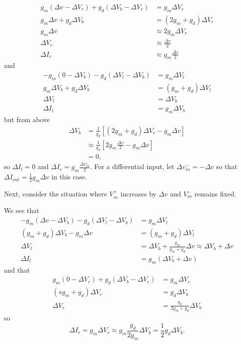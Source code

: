 \documentclass{article}
\begin{document}
\begin{align*}
g_m (\Delta v - \Delta V_r) + g_d (\Delta V_b - \Delta V_r) &= g_m \Delta V_r \\
g_m \Delta v + g_d \Delta V_b &= (2 g_m + g_d) \Delta V_r \\
g_m \Delta v &\approx 2 g_m \Delta V_r \\
\Delta V_r &\approx \frac{\Delta v}{2} \\
\Delta I_r &\approx g_m \frac{\Delta v}{2}
\end{align*}
and
\begin{align*}
-g_m (0 - \Delta V_b) - g_d (\Delta V_l - \Delta V_b) &= g_m \Delta V_l \\
g_m \Delta V_b + g_d \Delta V_b &= (g_m + g_d) \Delta V_l \\
\Delta V_l &= \Delta V_b \\
\Delta I_l &= g_m \Delta V_b
\end{align*}
but from above
\begin{align*}
\Delta V_b &= \frac{1}{g_d} [(2 g_m + g_d) \Delta V_r - g_m \Delta v] \\
           &\approx \frac{1}{g_d} [2 g_m \frac{\Delta v}{2} - g_m \Delta v] \\
           &= 0,
\end{align*}
so $\Delta I_l = 0$ and $\Delta I_r = g_m \frac{\Delta v_{in}^{-}}{2}$. For a
differential input, let $\Delta v_{in}^{-} = -\Delta v$ so that
$\Delta I_{out} = \frac{1}{2} g_m \Delta v$ in this case.

Next, consider the situation where $V_{in}^{+}$ increases by $\Delta v$ 
and $V_{in}^{-}$ remains fixed. 

We see that
\begin{align*}
  -g_m (\Delta v - \Delta V_b) - g_d (\Delta V_l - \Delta V_b) &= g_m \Delta V_l \\
  (g_m + g_d) \Delta V_b - g_m \Delta v &= (g_m + g_d) \Delta V_l \\
  \Delta V_l &= \Delta V_b + \frac{g_m}{g_m + g_d} \Delta v \approx \Delta V_b + \Delta v \\
  \Delta I_l &= g_m (\Delta V_b + \Delta v)
\end{align*}
and that
\begin{align*}
g_m (0 - \Delta V_r) + g_d (\Delta V_b - \Delta V_r) &= g_m \Delta V_r \\
(s g_m + g_d) \Delta V_r &= g_d \Delta V_b \\
\Delta V_r &= \frac{g_d}{2 g_m + g_d} \Delta V_b
\end{align*}
so
$$
\Delta I_r = g_m \Delta V_r 
           \approx g_m \frac{g_d}{2 g_m} \Delta V_b 
           = \frac{1}{2} g_d \Delta V_b.
$$
\end{document}

